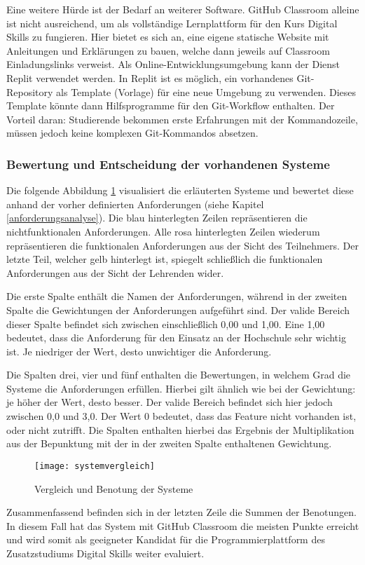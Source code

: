 Eine weitere Hürde ist der Bedarf an weiterer Software. GitHub Classroom alleine
ist nicht ausreichend, um als vollständige Lernplattform für den Kurs Digital
Skills zu fungieren. Hier bietet es sich an, eine eigene statische Website
mit Anleitungen und Erklärungen zu bauen, welche dann jeweils auf Classroom
Einladungslinks verweist. Als Online-Entwicklungsumgebung kann der Dienst Replit
verwendet werden. In Replit ist es möglich, ein vorhandenes Git-Repository als
Template (Vorlage) für eine neue Umgebung zu verwenden. Dieses Template könnte
dann Hilfsprogramme für den Git-Workflow enthalten. Der Vorteil daran:
Studierende bekommen erste Erfahrungen mit der Kommandozeile, müssen jedoch
keine komplexen Git-Kommandos absetzen.

\subsubsection{Bewertung und Entscheidung der vorhandenen Systeme}
Die folgende Abbildung \ref{fig:systemvergleich} visualisiert die erläuterten
Systeme und bewertet diese anhand der vorher definierten Anforderungen (siehe 
Kapitel \ref{anforderungsanalyse}). Die blau hinterlegten Zeilen repräsentieren
die nichtfunktionalen Anforderungen. Alle rosa hinterlegten Zeilen wiederum
repräsentieren die funktionalen Anforderungen aus der Sicht des Teilnehmers. Der
letzte Teil, welcher gelb hinterlegt ist, spiegelt schließlich die funktionalen
Anforderungen aus der Sicht der Lehrenden wider.

Die erste Spalte enthält die Namen der Anforderungen, während in der zweiten
Spalte die Gewichtungen der Anforderungen aufgeführt sind. Der valide Bereich
dieser Spalte befindet sich zwischen einschließlich 0,00 und 1,00. Eine 1,00
bedeutet, dass die Anforderung für den Einsatz an der Hochschule sehr wichtig
ist. Je niedriger der Wert, desto unwichtiger die Anforderung.

Die Spalten drei, vier und fünf enthalten die Bewertungen, in welchem Grad die
Systeme die Anforderungen erfüllen. Hierbei gilt ähnlich wie bei der Gewichtung:
je höher der Wert, desto besser. Der valide Bereich befindet sich hier jedoch
zwischen 0,0 und 3,0. Der Wert 0 bedeutet, dass das Feature nicht vorhanden ist,
oder nicht zutrifft. Die Spalten enthalten hierbei das Ergebnis der
Multiplikation aus der Bepunktung mit der in der zweiten Spalte enthaltenen
Gewichtung.

\begin{figure}[H]
    \centering
    \texttt{[image: systemvergleich]}
    \caption{Vergleich und Benotung der Systeme}
    \label{fig:systemvergleich}
\end{figure}

Zusammenfassend befinden sich in der letzten Zeile die Summen der Benotungen. In
diesem Fall hat das System mit GitHub Classroom die meisten Punkte erreicht und
wird somit als geeigneter Kandidat für die Programmierplattform des
Zusatzstudiums Digital Skills weiter evaluiert.